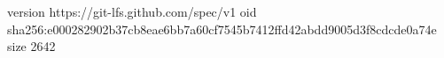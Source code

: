 version https://git-lfs.github.com/spec/v1
oid sha256:e000282902b37cb8eae6bb7a60cf7545b7412ffd42abdd9005d3f8cdcde0a74e
size 2642
